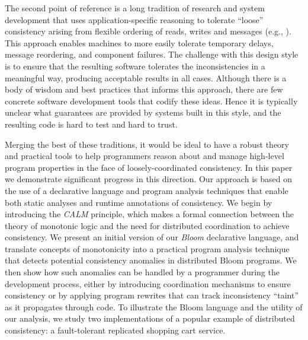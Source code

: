 The second point of reference is a long tradition of research and system development that uses application-specific reasoning to tolerate ``loose'' consistency arising from flexible ordering of reads, writes and messages (e.g., \cite{sagas,helland2007life,quicksand,base}). This approach enables machines to more easily tolerate temporary delays, message reordering, and component failures.  
The challenge with this design style is to ensure that the resulting software tolerates the inconsistencies in a meaningful way, producing acceptable results in all cases.  Although there is a body of wisdom and best practices that informs this approach, there are few concrete software development tools that codify these ideas.  Hence it is typically unclear what guarantees are provided by systems built in this style, and the resulting code is hard to test and hard to trust.  

Merging the best of these traditions, it would be ideal to have a robust theory and practical tools to  help programmers reason about and manage high-level program properties in the face of loosely-coordinated consistency.  In this paper we demonstrate significant progress in this direction.  Our approach is based on the use of a declarative language and program analysis techniques that enable both static analyses and runtime annotations of consistency.  We begin by introducing the \emph{CALM} principle, which makes a formal connection between the theory of monotonic logic and the need for distributed coordination to achieve consistency.  We present an initial version of our {\em Bloom} declarative language, and translate concepts of monotonicity into a practical program analysis technique that detects potential consistency anomalies in distributed Bloom programs.  We then show how such anomalies can be handled by a programmer during the development process, either by introducing coordination mechanisms to ensure consistency or by applying program rewrites that can track inconsistency ``taint'' as it propagates through code.  To illustrate the Bloom language and the utility of our analysis, we study two implementations of a popular example of distributed consistency: a fault-tolerant replicated shopping cart service. 


